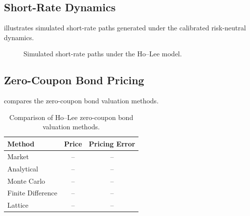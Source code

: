 \documentclass[11pt,a4paper]{article}
\numberwithin{equation}{section}
\begin{document}
\subsection{Short-Rate Dynamics}

 illustrates simulated short-rate paths generated under
the calibrated risk-neutral dynamics.

\begin{figure}[H]
    \centering



    \caption{Simulated short-rate paths under the Ho--Lee model.}
    \label{fig:paths}
\end{figure}


\subsection{Zero-Coupon Bond Pricing}

 compares the zero-coupon bond valuation methods.

\begin{table}[H]
    \centering

    \caption{Comparison of Ho--Lee zero-coupon bond valuation methods.}
    \label{tab:zcb_pricing}

    \renewcommand{\arraystretch}{1.2}

    \begin{tabular}{lcc}
        \toprule
        \textbf{Method}
        &
        \textbf{Price}
        &
        \textbf{Pricing Error}
        \\
        \midrule
        Market
        & -- & -- \\
        Analytical
        & -- & -- \\
        Monte Carlo
        & -- & -- \\
        Finite Difference
        & -- & -- \\
        Lattice
        & -- & -- \\
        \bottomrule
    \end{tabular}
\end{table}
\end{document}
